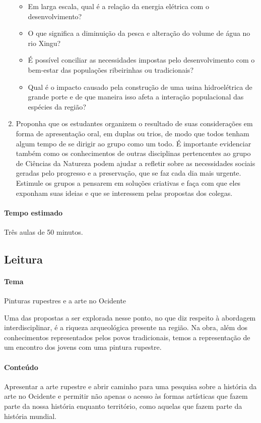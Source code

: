 \documentclass[12pt]{extarticle}
\begin{document}
\begin{enumerate}
\begin{itemize}
\item
  Em larga escala, qual é a relação da energia elétrica com o
  desenvolvimento?
\item
  O que significa a diminuição da pesca e alteração do volume de água no
  rio Xingu?
\item
  É possível conciliar as necessidades impostas pelo desenvolvimento com
  o bem-estar das populações ribeirinhas ou tradicionais?
\item
  Qual é o impacto causado pela construção de uma usina hidroelétrica de
  grande porte e de que maneira isso afeta a interação populacional das
  espécies da região?
\end{itemize}

\item Proponha que os estudantes organizem o resultado de suas
considerações em forma de apresentação oral, em duplas ou trios, de
modo que todos tenham algum tempo de se dirigir ao grupo como um
todo. É importante evidenciar também como os conhecimentos de outras
disciplinas pertencentes ao grupo de Ciências da Natureza podem
ajudar a refletir sobre as necessidades sociais geradas pelo
progresso e a preservação, que se faz cada dia mais urgente.
Estimule os grupos a pensarem em soluções criativas e faça com que
eles exponham suas ideias e que se interessem pelas propostas dos
colegas.
  \end{enumerate}

\paragraph{Tempo estimado} Três aulas de 50 minutos.

\subsection{Leitura}

\paragraph{Tema} Pinturas rupestres e a arte no Ocidente

Uma das propostas a ser explorada nesse ponto, no que diz respeito à
abordagem interdisciplinar, é a riqueza arqueológica presente na
região. Na obra, além dos conhecimentos representados pelos povos
tradicionais, temos a representação de um encontro dos jovens com uma
pintura rupestre.

\paragraph{Conteúdo}
Apresentar a arte rupestre e abrir caminho para uma pesquisa sobre a
história da arte no Ocidente e permitir não apenas o acesso às formas
artísticas que fazem parte da nossa história enquanto território, como
aquelas que fazem parte da história mundial.
\end{document}
